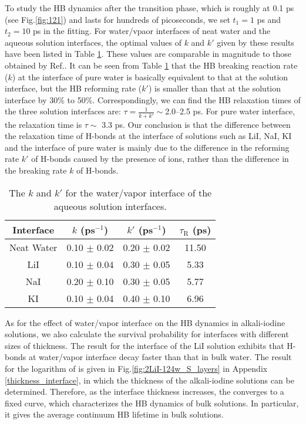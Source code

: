 To study the HB dynamics after the transition phase, which is roughly at 0.1 ps (see Fig.\thinspace\ref{fig:121}) and lasts for hundreds of picoseconds, 
we set $t_1 = 1$ ps and $t_2 = 10$ ps in the fitting.
For water/vpaor interfaces of neat water and the aqueous solution interfaces, 
the optimal values of $k$ and $k'$ given by these results have been listed in Table \ref{tab:k_k_prime_pure_and_solutions}. 
These values are comparable in magnitude to those obtained by Ref.. 
It can be seen from Table \ref{tab:k_k_prime_pure_and_solutions} that the HB breaking reaction rate ($k$) at the interface of pure water is basically equivalent to 
that at the solution interface, but the HB reforming rate ($k'$) is smaller than that at the solution interface by 30\% to 50\%.
Correspondingly, we can find the HB relaxation times of the three solution interfaces are: $\tau=\frac{1}{k+k'} \sim $2.0--2.5 ps. 
For pure water interface, the relaxation time is $\tau \sim $ 3.3 ps. 
Our conclusion is that the difference between the relaxation time of H-bonds at the interface of solutions such as LiI, NaI, KI 
and the interface of pure water is mainly due to the difference in the reforming rate $k'$ of H-bonds caused by the presence of ions,
rather than the difference in the breaking rate $k$ of H-bonds.
%
\begin{table}[htbp]
\centering
\caption{\label{tab:k_k_prime_pure_and_solutions} 
    The $k$ and $k'$ for the water/vapor interface of the aqueous solution interfaces.} 
\begin{tabular}{cccc}
 Interface & $k$ (ps$^{-1}$) & $k'$ (ps$^{-1}$) & $\tau_{\text{R}}$ (ps) \\
\hline
  Neat Water & 0.10 $\pm$ 0.02 & 0.20 $\pm$ 0.02 & 11.50 \\
  LiI & 0.10 $\pm$ 0.04 & 0.30 $\pm$ 0.05 & 5.33 \\
  NaI & 0.20 $\pm$ 0.10 & 0.30 $\pm$ 0.05 & 5.77 \\
  KI  & 0.10 $\pm$ 0.04 & 0.40 $\pm$ 0.10 & 6.96 
\end{tabular}
\end{table}
As for the effect of water/vapor interface on the HB dynamics in alkali-iodine solutions,
we also calculate the survival probability for interfaces with different sizes of thickness. 
The result for the interface of the LiI solution exhibits that H-bonds at water/vapor interface decay faster than that in bulk water.
The result for the logarithm of \SHB is given in Fig.\space\ref{fig:2LiI-124w_S_layers} in Appendix \ref{thickness_interface}, 
in which the thickness of the alkali-iodine solutions can be determined.
Therefore, as the interface thickness increases, the \SHB converges to a fixed curve, 
which characterizes the HB dynamics of bulk solutions. 
In particular, it gives the average continuum HB lifetime in bulk solutions.
